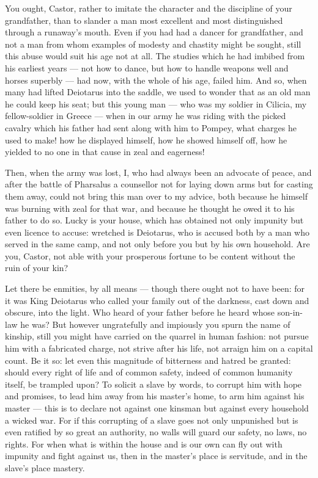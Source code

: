  You ought, Castor, rather to imitate the character and the discipline of your grandfather, than to slander a man most excellent and most distinguished through a runaway's mouth. Even if you had had a dancer for grandfather, and not a man from whom examples of modesty and chastity might be sought, still this abuse would suit his age not at all. The studies which he had imbibed from his earliest years --- not how to dance, but how to handle weapons well and horses superbly --- had now, with the whole of his age, failed him. And so, when many had lifted Deiotarus into the saddle, we used to wonder that as an old man he could keep his seat; but this young man --- who was my soldier in Cilicia, my fellow-soldier in Greece --- when in our army he was riding with the picked cavalry which his father had sent along with him to Pompey, what charges he used to make! how he displayed himself, how he showed himself off, how he yielded to no one in that cause in zeal and eagerness!

 Then, when the army was lost, I, who had always been an advocate of peace, and after the battle of Pharsalus a counsellor not for laying down arms but for casting them away, could not bring this man over to my advice, both because he himself was burning with zeal for that war, and because he thought he owed it to his father to do so. Lucky is your house, which has obtained not only impunity but even licence to accuse: wretched is Deiotarus, who is accused both by a man who served in the same camp, and not only before you but by his own household. Are you, Castor, not able with your prosperous fortune to be content without the ruin of your kin?

 Let there be enmities, by all means --- though there ought not to have been: for it was King Deiotarus who called your family out of the darkness, cast down and obscure, into the light. Who heard of your father before he heard whose son-in-law he was? But however ungratefully and impiously you spurn the name of kinship, still you might have carried on the quarrel in human fashion: not pursue him with a fabricated charge, not strive after his life, not arraign him on a capital count. Be it so: let even this magnitude of bitterness and hatred be granted: should every right of life and of common safety, indeed of common humanity itself, be trampled upon? To solicit a slave by words, to corrupt him with hope and promises, to lead him away from his master's home, to arm him against his master --- this is to declare not against one kinsman but against every household a wicked war. For if this corrupting of a slave goes not only unpunished but is even ratified by so great an authority, no walls will guard our safety, no laws, no rights. For when what is within the house and is our own can fly out with impunity and fight against us, then in the master's place is servitude, and in the slave's place mastery.


